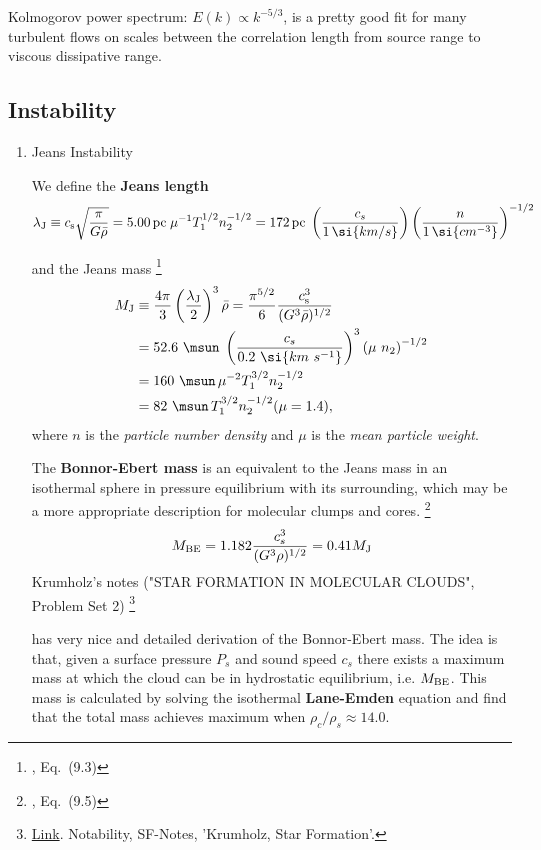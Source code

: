 Kolmogorov power spectrum: $E(k) \propto k^{-5/3}$,  is a pretty good fit for many turbulent flows on scales between the correlation length from source range to viscous dissipative range. 

\subsection{Instability}
\label{sec:orgbde3f05}

\begin{enumerate}
\item Jeans Instability
\label{sec:org674bcd0}
\label{org21524df}

We define the \textbf{Jeans length}
$$\lambda_{\rm J} \equiv c_{\rm s} \sqrt{\frac{\pi}{G \bar\rho}} = 5.00\,{\rm pc} \; \mu^{-1} T_1^{1/2} n_2^{-1/2} = 172\,{\rm pc} \; \left ( \frac{c_{s}}{1\,\si{km/s}} \right ) \left( \frac{n}{1\,\si{cm^{-3}}} \right)^{-1/2}  $$

and the Jeans mass \footnote{\cite{Mo2010}, Eq. (9.3)}
\begin{align}
  \label{}
M_{\rm J} &\equiv \frac{4\pi}{3} \left( \frac{\lambda_{\rm J}}{2}\right)^3 \bar\rho
  = \frac{\pi^{5/2}}{6} \frac{c_{\rm s}^3}{(G^3 \bar\rho)^{1/2}} \\
  &= 52.6~\msun \; \left( \frac{c_s}{0.2~\si{km~s^{-1}}} \right)^3 \left( \mu~n_2 \right)^{-1/2}\\
  &= 160~\msun \, \mu^{-2} T_1^{3/2} n_2^{-1/2}\\
  &= 82~\msun \, T_1^{3/2} n_2^{-1/2} (\mu = 1.4),
\end{align}
where \(n\) is the \emph{particle number density} and \(\mu\) is the \emph{mean particle weight}.

The \textbf{Bonnor-Ebert mass} is an equivalent to the Jeans mass in an isothermal sphere in pressure equilibrium with its surrounding, which may be a more appropriate description for molecular clumps and cores. \footnote{\cite{Mo2010}, Eq. (9.5)}
$$\label{eq:MBE}
  M_{\rm BE} = 1.182 \frac{c_s^3}{(G^3 \rho)^{1/2}} = 0.41 M_{\rm J}$$
Krumholz's notes ("STAR FORMATION IN MOLECULAR CLOUDS", Problem Set 2) \footnote{\href{https://ned.ipac.caltech.edu/level5/Sept10/Krumholz/Krumholz\_contents.html}{Link}.
Notability, SF-Notes, 'Krumholz, Star Formation'.}

has very nice and detailed derivation of the Bonnor-Ebert mass. The idea is that, given a surface pressure \(P_s\) and sound speed \(c_s\) there exists a maximum mass at which the cloud can be in hydrostatic equilibrium, i.e. \(M_{\rm BE}\). This mass is calculated by solving the isothermal \textbf{Lane-Emden} equation and find that the total mass achieves maximum when \(\rho_c / \rho_s \approx 14.0\).


\end{enumerate}
